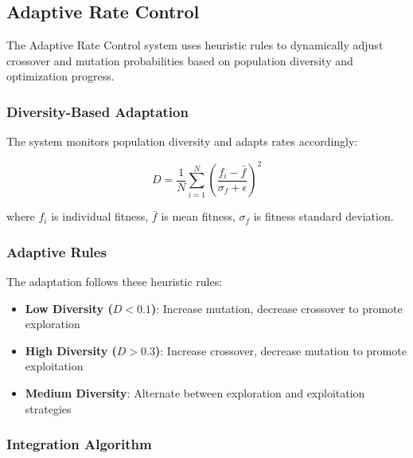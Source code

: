 \documentclass[12pt,a4paper]{article}
\begin{document}
\subsection{Adaptive Rate Control}

The Adaptive Rate Control system uses heuristic rules to dynamically adjust crossover and mutation probabilities based on population diversity and optimization progress.

\subsubsection{Diversity-Based Adaptation}

The system monitors population diversity and adapts rates accordingly:

\begin{equation}\label{Eq.diversity_measure}
D = \frac{1}{N} \sum_{i=1}^{N} \left( \frac{f_i - \bar{f}}{\sigma_f + \epsilon} \right)^2
\end{equation}

where $f_i$ is individual fitness, $\bar{f}$ is mean fitness, $\sigma_f$ is fitness standard deviation.

\subsubsection{Adaptive Rules}

The adaptation follows these heuristic rules:

\begin{itemize}
    \item \textbf{Low Diversity ($D < 0.1$)}: Increase mutation, decrease crossover to promote exploration
    \item \textbf{High Diversity ($D > 0.3$)}: Increase crossover, decrease mutation to promote exploitation
    \item \textbf{Medium Diversity}: Alternate between exploration and exploitation strategies
\end{itemize}

\subsubsection{Integration Algorithm}
\end{document}
